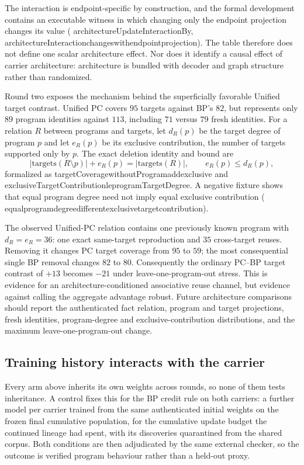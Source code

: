 \documentclass[11pt]{article}
\newcommand{\leanname}[1]{{\scriptsize\ttfamily
  \def\_{\textunderscore\allowbreak}#1}}
\begin{document}
The interaction is endpoint-specific by construction, and the formal development
contains an executable witness in which changing only the endpoint projection changes
its value
(\leanname{architectureUpdateInteractionBy},
\leanname{architectureInteraction\_changes\_with\_endpoint\_projection}).
The table therefore does not define one scalar architecture effect. Nor does it
identify a causal effect of carrier architecture: architecture is bundled with decoder
and graph structure rather than randomized.

Round two exposes the mechanism behind the superficially favorable Unified target
contrast. Unified PC covers $95$ targets against BP's $82$, but represents only $89$
program identities against $113$, including $71$ versus $79$ fresh identities. For a
relation $R$ between programs and targets, let $d_R(p)$ be the target degree of program
$p$ and let $e_R(p)$ be its exclusive contribution, the number of targets supported
only by $p$. The exact deletion identity and bound are
\[
 |\mathrm{targets}(R\setminus p)|+e_R(p)=|\mathrm{targets}(R)|,
 \qquad e_R(p)\le d_R(p),
\]
formalized as
\leanname{targetCoverage\_withoutProgram\_add\_exclusive} and
\leanname{exclusiveTargetContribution\_le\_programTargetDegree}. A negative fixture
shows that equal program degree need not imply equal exclusive contribution
(\leanname{equal\_program\_degree\_different\_exclusive\_target\_contribution}).

The observed Unified-PC relation contains one previously known program with
$d_R=e_R=36$: one exact same-target reproduction and $35$ cross-target reuses.
Removing it changes PC target coverage from $95$ to $59$; the most consequential
single BP removal changes $82$ to $80$. Consequently the ordinary PC--BP target
contrast of $+13$ becomes $-21$ under leave-one-program-out stress. This is evidence
for an architecture-conditioned associative reuse channel, but evidence against
calling the aggregate advantage robust. Future architecture comparisons should report
the authenticated fact relation, program and target projections, fresh identities,
program-degree and exclusive-contribution distributions, and the maximum
leave-one-program-out change.

\subsection{Training history interacts with the carrier}
\label{sec:training-history-interaction}

Every arm above inherits its own weights across rounds, so none of them tests inheritance.
A control fixes this for the BP credit rule on both carriers: a further model per carrier
trained from the same authenticated initial weights on the frozen final cumulative
population, for the cumulative update budget the continued lineage had spent, with its
discoveries quarantined from the shared corpus. Both conditions are then adjudicated by the
same external checker, so the outcome is verified program behaviour rather than a held-out
proxy.
\end{document}
